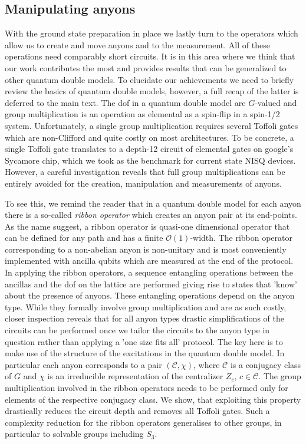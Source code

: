 \documentclass[two column]{article}
\begin{document}
\subsection{Manipulating anyons}
With the ground state preparation in place we lastly turn to the operators which allow us to create and move anyons and to the measurement. All of these operations need comparably short circuits. It is in this area where we think that our work contributes the most and provides results that can be generalized to other quantum double models. To elucidate our achievements we need to briefly review the basics of quantum double models, however, a full recap of the latter is deferred to the main text. The dof in a quantum double model are $G$-valued and group multiplication is an operation as elemental as a spin-flip in a spin-1/2 system. Unfortunately, a single group multiplication requires several Toffoli gates which are non-Clifford and quite costly on most architectures. To be concrete, a single Toffoli gate translates to a depth-12 circuit of elemental gates on google's Sycamore chip, which we took as the benchmark for current state NISQ devices. However, a careful investigation reveals that full group multiplications can be entirely avoided for the creation, manipulation and measurements of anyons. 

To see this, we remind the reader that in a quantum double model for each anyon there is a so-called \emph{ribbon operator} which creates an anyon pair at its end-points. As the name suggest, a ribbon operator is quasi-one dimensional operator that can be defined for any path and has a finite $\mathcal O(1)$-width. The ribbon operator corresponding to a non-abelian anyon is non-unitary and is most conveniently implemented with ancilla qubits which are measured at the end of the protocol. In applying the ribbon operators, a sequence entangling operations between the ancillas and the dof on the lattice are performed giving rise to states that 'know' about the presence of anyons. These entangling operations depend on the anyon type. While they formally involve group multiplication and are as such costly, closer inspection reveals that for all anyon types drastic simplifications of the circuits can be performed once we tailor the circuits to the anyon type in question rather than applying a 'one size fits all' protocol. The key here is to make use of the structure of the excitations in the quantum double model. In particular each anyon corresponds to a pair $(\mathcal C,\chi)$, where $\mathcal C$ is a conjugacy class of $G$ and $\chi$ is an irreducible representation of the centralizer $Z_c$, $c \in \mathcal C$. The group multiplication involved in the ribbon operators needs to be performed only for elements of the respective conjugacy class. We show, that exploiting this property drastically reduces the circuit depth and removes all Toffoli gates. Such a complexity reduction for the ribbon operators generalises to other groups, in particular to solvable groups including $S_3$. 
\end{document}
